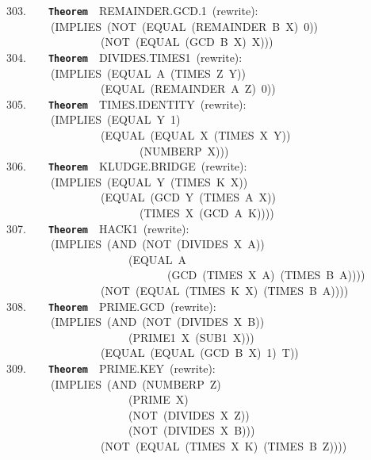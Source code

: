 \documentclass[11pt]{book}
\newenvironment{pubasis}{\begin{flushleft}\ttfamily\small}{\normalsize\rmfamily\end{flushleft}}
\newcommand{\axiomordefinition}[1]{\vspace{6pt}\texttt{\textbf{#1}}}
\begin{document}
\begin{pubasis}
303.~~~~\axiomordefinition{Theorem}~~REMAINDER.GCD.1~(rewrite):\\
~~~~~~~~(IMPLIES~(NOT~(EQUAL~(REMAINDER~B~X)~0))\\
~~~~~~~~~~~~~~~~~(NOT~(EQUAL~(GCD~B~X)~X)))\\

304.~~~~\axiomordefinition{Theorem}~~DIVIDES.TIMES1~(rewrite):\\
~~~~~~~~(IMPLIES~(EQUAL~A~(TIMES~Z~Y))\\
~~~~~~~~~~~~~~~~~(EQUAL~(REMAINDER~A~Z)~0))\\

305.~~~~\axiomordefinition{Theorem}~~TIMES.IDENTITY~(rewrite):\\
~~~~~~~~(IMPLIES~(EQUAL~Y~1)\\
~~~~~~~~~~~~~~~~~(EQUAL~(EQUAL~X~(TIMES~X~Y))\\
~~~~~~~~~~~~~~~~~~~~~~~~(NUMBERP~X)))\\

306.~~~~\axiomordefinition{Theorem}~~KLUDGE.BRIDGE~(rewrite):\\
~~~~~~~~(IMPLIES~(EQUAL~Y~(TIMES~K~X))\\
~~~~~~~~~~~~~~~~~(EQUAL~(GCD~Y~(TIMES~A~X))\\
~~~~~~~~~~~~~~~~~~~~~~~~(TIMES~X~(GCD~A~K))))\\

307.~~~~\axiomordefinition{Theorem}~~HACK1~(rewrite):\\
~~~~~~~~(IMPLIES~(AND~(NOT~(DIVIDES~X~A))\\
~~~~~~~~~~~~~~~~~~~~~~(EQUAL~A\\
~~~~~~~~~~~~~~~~~~~~~~~~~~~~~(GCD~(TIMES~X~A)~(TIMES~B~A))))\\
~~~~~~~~~~~~~~~~~(NOT~(EQUAL~(TIMES~K~X)~(TIMES~B~A))))\\

308.~~~~\axiomordefinition{Theorem}~~PRIME.GCD~(rewrite):\\
~~~~~~~~(IMPLIES~(AND~(NOT~(DIVIDES~X~B))\\
~~~~~~~~~~~~~~~~~~~~~~(PRIME1~X~(SUB1~X)))\\
~~~~~~~~~~~~~~~~~(EQUAL~(EQUAL~(GCD~B~X)~1)~T))\\

309.~~~~\axiomordefinition{Theorem}~~PRIME.KEY~(rewrite):\\
~~~~~~~~(IMPLIES~(AND~(NUMBERP~Z)\\
~~~~~~~~~~~~~~~~~~~~~~(PRIME~X)\\
~~~~~~~~~~~~~~~~~~~~~~(NOT~(DIVIDES~X~Z))\\
~~~~~~~~~~~~~~~~~~~~~~(NOT~(DIVIDES~X~B)))\\
~~~~~~~~~~~~~~~~~(NOT~(EQUAL~(TIMES~X~K)~(TIMES~B~Z))))\\


\end{pubasis}
\end{document}
